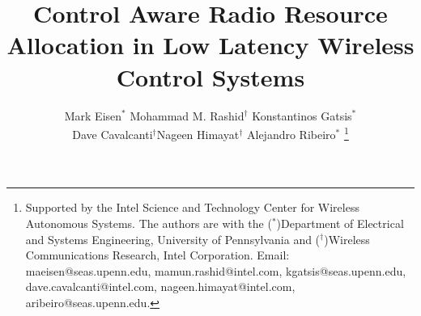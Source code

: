 \documentclass[journal]{IEEEtran}
\title{Control Aware Radio Resource Allocation in Low Latency Wireless Control Systems}
\author{Mark Eisen$^*$ \quad Mohammad M. Rashid$^\dagger$ \quad Konstantinos Gatsis$^*$ \\ \textup{Dave Cavalcanti$^\dagger$\quad Nageen Himayat$^{\dagger}$ \quad Alejandro Ribeiro$^*$}
\thanks{Supported by the Intel Science and Technology Center for Wireless Autonomous Systems. The authors are with the ($^*$)Department of Electrical and Systems Engineering, University of Pennsylvania and ($^\dagger$)Wireless Communications Research, Intel Corporation. Email: maeisen@seas.upenn.edu, mamun.rashid@intel.com, kgatsis@seas.upenn.edu, dave.cavalcanti@intel.com, nageen.himayat@intel.com, aribeiro@seas.upenn.edu.}}
\begin{document}
\thispagestyle{empty}
\maketitle

%
\begin{abstract}

\end{abstract}
\end{document}
